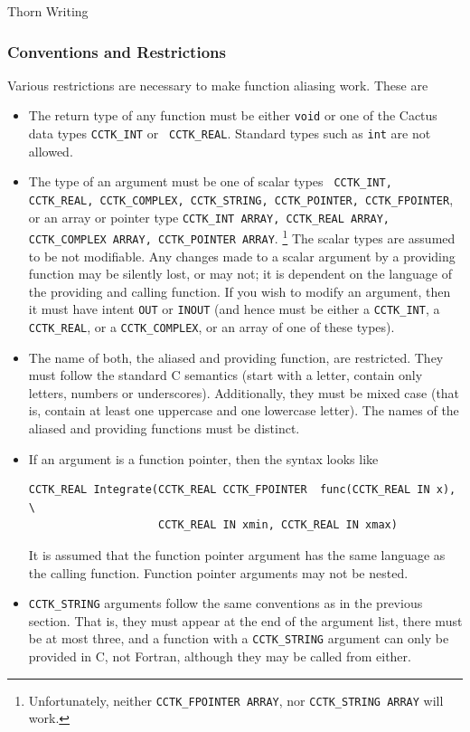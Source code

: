 \begin{cactuspart}{Thorn Writing}
\subsubsection{Conventions and Restrictions}

Various restrictions are necessary to make function aliasing
work. These are
\begin{itemize}
\item The return type of any function must be either \texttt{void} or one
  of the Cactus data types \texttt{CCTK\_INT} or {\tt
    CCTK\_REAL}. Standard types such as \texttt{int} are not allowed.
\item The type of an argument must be one of scalar types {\tt
    CCTK\_INT, CCTK\_REAL, CCTK\_COMPLEX, CCTK\_STRING, CCTK\_POINTER,
    CCTK\_FPOINTER}, or an array or pointer type \texttt{CCTK\_INT ARRAY,
    CCTK\_REAL ARRAY, CCTK\_COMPLEX ARRAY, \texttt{CCTK\_POINTER ARRAY}}.%
\footnote{%
         Unfortunately, neither \texttt{CCTK\_FPOINTER ARRAY},
         nor \texttt{CCTK\_STRING ARRAY} will work.
         }%
  {}  The scalar types are assumed to be not
  modifiable. Any changes made to a scalar argument by a providing
  function may be silently lost, or may not; it is dependent on the
  language of the providing and calling function. If you wish to
  modify an argument, then it must have intent \texttt{OUT} or \texttt{INOUT}
  (and hence must be either a \texttt{CCTK\_INT}, a
  \texttt{CCTK\_REAL}, or a \texttt{CCTK\_COMPLEX},
  or an array of one of these types).
\item The name of both, the aliased and providing function, are
  restricted. They must follow the standard C semantics (start with a
  letter, contain only letters, numbers or underscores). Additionally,
  they must be mixed case (that is, contain at least one uppercase and
  one lowercase letter). The names of the aliased and providing
  functions must be distinct.
\item If an argument is a function pointer, then the syntax looks like
\begin{verbatim}
CCTK_REAL Integrate(CCTK_REAL CCTK_FPOINTER  func(CCTK_REAL IN x), \
                    CCTK_REAL IN xmin, CCTK_REAL IN xmax)
\end{verbatim}
  It is assumed that the function pointer argument has the same
  language as the calling function. Function pointer arguments may not
  be nested.
\item \texttt{CCTK\_STRING} arguments follow the same conventions as in
  the previous section. That is, they must appear at the end of the
  argument list, there must be at most three, and a function with a
  \texttt{CCTK\_STRING} argument can only be provided in C, not Fortran,
  although they may be called from either.
\end{itemize}



\end{cactuspart}
